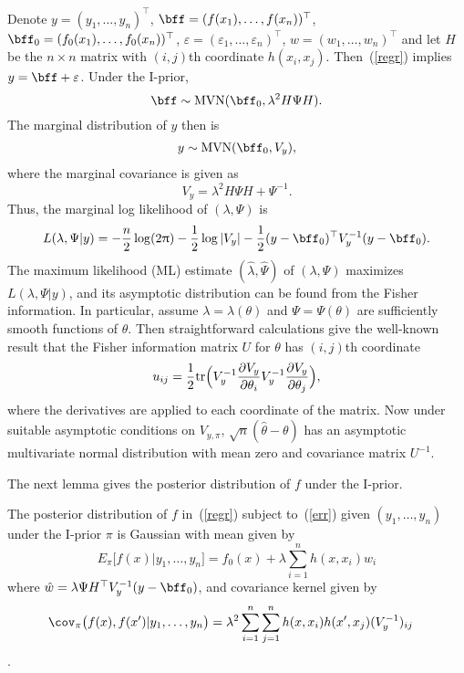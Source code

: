 \documentclass[preprint,12pt,authoryear]{elsarticle}
\DeclareMathOperator{\MVN}{MVN}
\newcommand{\tr}{\mbox{\rm tr}}
\begin{document}
Denote $y=(y_1,\ldots,y_n)^\top$, $\bff=(f(x_1),\ldots,f(x_n))^\top$, $\bff_0=(f_0(x_1),\ldots,f_0(x_n))^\top$, $\varepsilon=(\varepsilon_1,\ldots,\varepsilon_n)^\top$, $w=(w_1,\ldots,w_n)^\top$ and let $H$ be the $n\times n$ matrix with $(i,j)$th coordinate $h(x_i,x_j)$.
Then~(\ref{regr}) implies $y = \bff + \varepsilon$.
Under the I-prior,
\[  \bff \sim \MVN(\bff_0,\lambda^2 H\Psi H). \]
The marginal distribution of $y$ then is 
\begin{eqnarray}\label{ydist}
y \sim \MVN(\bff_0,V_{y}),
\end{eqnarray}
where the marginal covariance is given as
\[  V_{y}=\lambda^2 H\Psi H+\Psi^{-1}. \] 
Thus, the marginal log likelihood of $(\lambda,\Psi)$ is
\begin{equation}\label{marglik}  
L(\lambda,\Psi|y) =  -\frac{n}{2}\log(2\uppi) - \frac12\log|V_y| - \frac12(y-\bff_0)^\top V_y^{-1}(y-\bff_0). 
\end{equation}
The maximum likelihood (ML) estimate $(\hat\lambda,\hat\Psi)$ of $(\lambda,\Psi)$ maximizes $L(\lambda,\Psi|y)$, and its asymptotic distribution  can be found from the Fisher information. In particular, assume $\lambda=\lambda(\theta)$ and $\Psi=\Psi(\theta)$ are sufficiently smooth functions of $\theta$. Then straightforward  calculations give the well-known result that the Fisher information matrix $U$ for $\theta$ has $(i,j)$th coordinate
\[ u_{ij} = \frac12\tr\Big(V_y^{-1}\frac{\partial V_y}{\partial\theta_i}V_y^{-1}\frac{\partial V_y}{\partial\theta_j} \Big), \]
where the derivatives are applied to each coordinate of the matrix.
Now under suitable asymptotic conditions on $V_{y,\pi}$, $\sqrt{n}(\hat\theta-\theta)$ has an asymptotic multivariate normal distribution with mean zero and covariance matrix $U^{-1}$.


The next lemma gives the posterior distribution of $f$ under the I-prior.
\begin{lemma}\label{lem-post}
	The posterior distribution of $f$ in~(\ref{regr}) subject to~(\ref{err}) given $(y_1,\ldots,y_n)$ under the I-prior $\pi$ is Gaussian with mean given by
	\[  E_\pi\big[f(x)|y_1,\ldots,y_n\big] = f_0(x) + \lambda\sum_{i=1}^n h(x,x_i)\hat w_i  \]
	where	%
	$\hat w    = \lambda\Psi H ^\top V_y^{-1}(y-\bff_0)$,
	and covariance kernel given by
	\begin{align*}
	\cov_{\pi}\big(f(x),f(x')|y_1,\ldots,y_n\big) &= \lambda^2\sum_{i=1}^n\sum_{j=1}^n h(x,x_i)h(x',x_j)(V_{y}^{-1})_{ij}
	\end{align*}.
\end{lemma}
\end{document}
